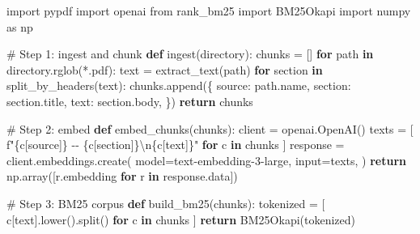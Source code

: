 \documentclass[
  letterpaper,
  11pt]{scrbook}
\newenvironment{Shaded}{\begin{snugshade}}{\end{snugshade}}
\newcommand{\BuiltInTok}[1]{\textcolor[rgb]{0.00,0.23,0.31}{#1}}
\newcommand{\CharTok}[1]{\textcolor[rgb]{0.13,0.47,0.30}{#1}}
\newcommand{\CommentTok}[1]{\textcolor[rgb]{0.37,0.37,0.37}{#1}}
\newcommand{\ControlFlowTok}[1]{\textcolor[rgb]{0.00,0.23,0.31}{\textbf{#1}}}
\newcommand{\ImportTok}[1]{\textcolor[rgb]{0.00,0.46,0.62}{#1}}
\newcommand{\KeywordTok}[1]{\textcolor[rgb]{0.00,0.23,0.31}{\textbf{#1}}}
\newcommand{\NormalTok}[1]{\textcolor[rgb]{0.00,0.23,0.31}{#1}}
\newcommand{\OperatorTok}[1]{\textcolor[rgb]{0.37,0.37,0.37}{#1}}
\newcommand{\SpecialCharTok}[1]{\textcolor[rgb]{0.37,0.37,0.37}{#1}}
\newcommand{\SpecialStringTok}[1]{\textcolor[rgb]{0.13,0.47,0.30}{#1}}
\newcommand{\StringTok}[1]{\textcolor[rgb]{0.13,0.47,0.30}{#1}}
\begin{document}
\begin{Shaded}
\begin{Highlighting}[]
\ImportTok{import}\NormalTok{ pypdf}
\ImportTok{import}\NormalTok{ openai}
\ImportTok{from}\NormalTok{ rank\_bm25 }\ImportTok{import}\NormalTok{ BM25Okapi}
\ImportTok{import}\NormalTok{ numpy }\ImportTok{as}\NormalTok{ np}

\CommentTok{\# Step 1: ingest and chunk}
\KeywordTok{def}\NormalTok{ ingest(directory):}
\NormalTok{    chunks }\OperatorTok{=}\NormalTok{ []}
    \ControlFlowTok{for}\NormalTok{ path }\KeywordTok{in}\NormalTok{ directory.rglob(}\StringTok{\textquotesingle{}*.pdf\textquotesingle{}}\NormalTok{):}
\NormalTok{        text }\OperatorTok{=}\NormalTok{ extract\_text(path)}
        \ControlFlowTok{for}\NormalTok{ section }\KeywordTok{in}\NormalTok{ split\_by\_headers(text):}
\NormalTok{            chunks.append(\{}
                \StringTok{\textquotesingle{}source\textquotesingle{}}\NormalTok{: path.name,}
                \StringTok{\textquotesingle{}section\textquotesingle{}}\NormalTok{: section.title,}
                \StringTok{\textquotesingle{}text\textquotesingle{}}\NormalTok{: section.body,}
\NormalTok{            \})}
    \ControlFlowTok{return}\NormalTok{ chunks}

\CommentTok{\# Step 2: embed}
\KeywordTok{def}\NormalTok{ embed\_chunks(chunks):}
\NormalTok{    client }\OperatorTok{=}\NormalTok{ openai.OpenAI()}
\NormalTok{    texts }\OperatorTok{=}\NormalTok{ [}
        \SpecialStringTok{f"}\SpecialCharTok{\{}\NormalTok{c[}\StringTok{\textquotesingle{}source\textquotesingle{}}\NormalTok{]}\SpecialCharTok{\}}\SpecialStringTok{ {-}{-} }\SpecialCharTok{\{}\NormalTok{c[}\StringTok{\textquotesingle{}section\textquotesingle{}}\NormalTok{]}\SpecialCharTok{\}}\CharTok{\textbackslash{}n}\SpecialCharTok{\{}\NormalTok{c[}\StringTok{\textquotesingle{}text\textquotesingle{}}\NormalTok{]}\SpecialCharTok{\}}\SpecialStringTok{"}
        \ControlFlowTok{for}\NormalTok{ c }\KeywordTok{in}\NormalTok{ chunks}
\NormalTok{    ]}
\NormalTok{    response }\OperatorTok{=}\NormalTok{ client.embeddings.create(}
\NormalTok{        model}\OperatorTok{=}\StringTok{\textquotesingle{}text{-}embedding{-}3{-}large\textquotesingle{}}\NormalTok{,}
        \BuiltInTok{input}\OperatorTok{=}\NormalTok{texts,}
\NormalTok{    )}
    \ControlFlowTok{return}\NormalTok{ np.array([r.embedding }\ControlFlowTok{for}\NormalTok{ r }\KeywordTok{in}\NormalTok{ response.data])}

\CommentTok{\# Step 3: BM25 corpus}
\KeywordTok{def}\NormalTok{ build\_bm25(chunks):}
\NormalTok{    tokenized }\OperatorTok{=}\NormalTok{ [}
\NormalTok{        c[}\StringTok{\textquotesingle{}text\textquotesingle{}}\NormalTok{].lower().split() }\ControlFlowTok{for}\NormalTok{ c }\KeywordTok{in}\NormalTok{ chunks}
\NormalTok{    ]}
    \ControlFlowTok{return}\NormalTok{ BM25Okapi(tokenized)}


\end{Highlighting}
\end{Shaded}
\end{document}
